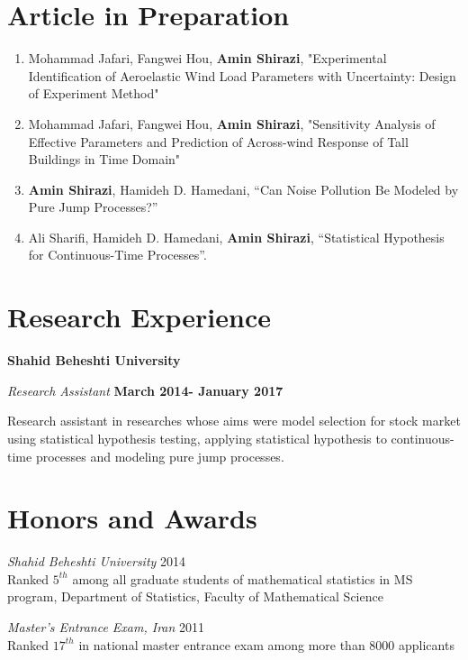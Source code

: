 \documentclass[margin,line]{res}
\begin{document}
\begin{resume}
\section{\sc Article in Preparation}
\begin{enumerate}
	\item 	Mohammad Jafari, Fangwei Hou, \textbf{Amin Shirazi}, "Experimental Identification of Aeroelastic Wind Load Parameters with Uncertainty: Design of Experiment Method"
	
	\item Mohammad Jafari, Fangwei Hou, \textbf{Amin Shirazi}, "Sensitivity Analysis of Effective Parameters and Prediction of Across-wind Response of Tall Buildings in Time Domain"
	
	\item \textbf{Amin Shirazi}, Hamideh D. Hamedani, “Can Noise Pollution Be Modeled by Pure Jump Processes?”
	
	\item Ali Sharifi, Hamideh D. Hamedani, \textbf{Amin Shirazi}, “Statistical Hypothesis for Continuous-Time Processes”. 
\end{enumerate}
\section{\sc Research Experience}
{\bf Shahid Beheshti University}

{\em Research Assistant } \hfill {\bf March 2014- January 2017}

\vspace{-.3cm}
Research assistant in researches whose aims were  model selection for stock market using statistical hypothesis testing, applying statistical hypothesis to continuous-time processes and modeling pure jump processes.



\section{\sc Honors and Awards}

{\em Shahid Beheshti University} \hfill 2014\\
 Ranked $5^{th}$ among all graduate students of mathematical statistics in MS program, Department of Statistics, Faculty of Mathematical Science 
 
{\em Master's Entrance Exam, Iran} \hfill 2011\\
Ranked $17^{th}$ in national master entrance exam among more than 8000 applicants 


\end{resume}
\end{document}
